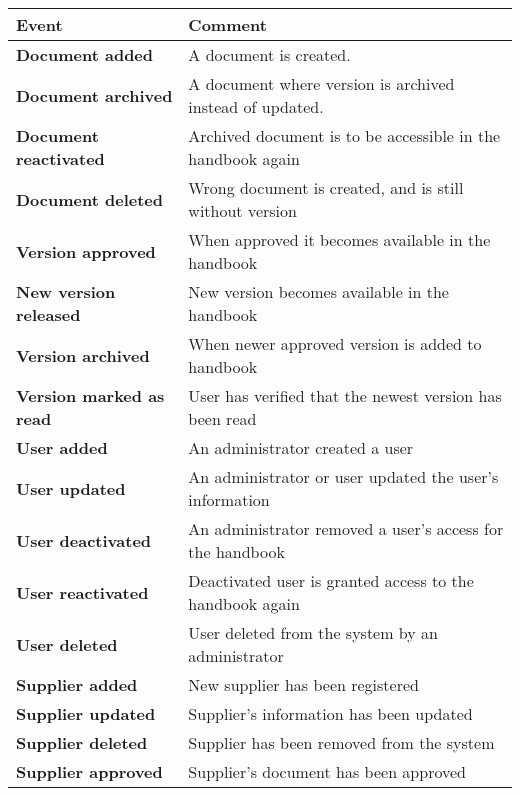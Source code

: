 \begin{table}[H]
	\begin{tabular}{m{} l}
		\hline
		Event & Comment\\
		\hline
		\textbf{Document added} & A document is created.\\
		\textbf{Document archived} & A document where version is archived instead of updated.\\
		\textbf{Document reactivated} & Archived document is to be accessible in the handbook again\\
		\textbf{Document deleted} & Wrong document is created, and is still without version\\
		\textbf{Version approved}  & When approved it becomes available in the handbook\\ 
		\textbf{New version released} &  New version becomes available in the handbook\\
		\textbf{Version archived} & When newer approved version is added to handbook\\
		\textbf{Version marked \newline as read} & User has verified that the newest version has been read\\
		\textbf{User added} & An administrator created a user\\
		\textbf{User updated} & An administrator or user updated the user's information\\
		\textbf{User deactivated} & An administrator removed a user's access for the handbook\\
		\textbf{User reactivated} & Deactivated user is granted access to the handbook again\\
		\textbf{User deleted} & User deleted from the system by an administrator\\
		\textbf{Supplier added} & New supplier has been registered\\
		\textbf{Supplier updated} & Supplier's information has been updated\\
		\textbf{Supplier deleted} & Supplier has been removed from the system\\
		\textbf{Supplier approved} & Supplier's document has been approved\\

\end{tabular}
\end{table}
